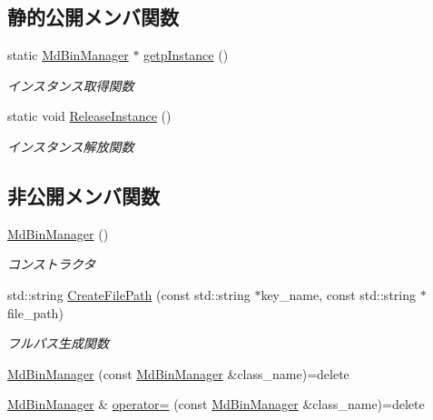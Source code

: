 \subsection*{静的公開メンバ関数}
\begin{DoxyCompactItemize}
\item 
static \mbox{\hyperlink{class_md_bin_manager}{Md\+Bin\+Manager}} $\ast$ \mbox{\hyperlink{class_md_bin_manager_a2e26bac953ea00748662887e58447f02}{getp\+Instance}} ()
\begin{DoxyCompactList}\small\item\em インスタンス取得関数 \end{DoxyCompactList}\item 
static void \mbox{\hyperlink{class_md_bin_manager_a2ac79acba875d5812356b377d2c7d165}{Release\+Instance}} ()
\begin{DoxyCompactList}\small\item\em インスタンス解放関数 \end{DoxyCompactList}\end{DoxyCompactItemize}
\subsection*{非公開メンバ関数}
\begin{DoxyCompactItemize}
\item 
\mbox{\hyperlink{class_md_bin_manager_a9badcf5942fc3c2610392df35184d73d}{Md\+Bin\+Manager}} ()
\begin{DoxyCompactList}\small\item\em コンストラクタ \end{DoxyCompactList}\item 
std\+::string \mbox{\hyperlink{class_md_bin_manager_a435f89bb7839d6eb67c7b24f3190d76c}{Create\+File\+Path}} (const std\+::string $\ast$key\+\_\+name, const std\+::string $\ast$file\+\_\+path)
\begin{DoxyCompactList}\small\item\em フルパス生成関数 \end{DoxyCompactList}\item 
\mbox{\hyperlink{class_md_bin_manager_a95626ea9eb89f46cd069a3edf03b0885}{Md\+Bin\+Manager}} (const \mbox{\hyperlink{class_md_bin_manager}{Md\+Bin\+Manager}} \&class\+\_\+name)=delete
\item 
\mbox{\hyperlink{class_md_bin_manager}{Md\+Bin\+Manager}} \& \mbox{\hyperlink{class_md_bin_manager_a17b8525afa9637fb07506178f1b01d9c}{operator=}} (const \mbox{\hyperlink{class_md_bin_manager}{Md\+Bin\+Manager}} \&class\+\_\+name)=delete
\end{DoxyCompactItemize}
